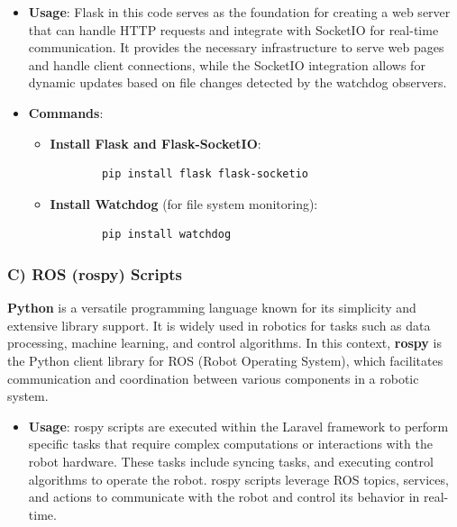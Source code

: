 \begin{itemize}
\item \textbf{Usage}: Flask in this code serves as the foundation for creating a web server that can handle HTTP requests and integrate with SocketIO for real-time communication. It provides the necessary infrastructure to serve web pages and handle client connections, while the SocketIO integration allows for dynamic updates based on file changes detected by the watchdog observers. 


\newpage
\item \textbf{Commands}:
    \begin{itemize}
        \item \textbf{Install Flask and Flask-SocketIO}:
        \begin{verbatim}
        pip install flask flask-socketio
        \end{verbatim}
        \vspace{-2mm}
        \item \textbf{Install Watchdog} (for file system monitoring):
        \begin{verbatim}
        pip install watchdog
        \end{verbatim}
        

    \end{itemize}

\end{itemize}

\vspace{-3mm}

\subsubsection*{C) ROS (rospy) Scripts}

\textbf{Python} is a versatile programming language known for its simplicity and extensive library support. It is widely used in robotics for tasks such as data processing, machine learning, and control algorithms. In this context, \textbf{rospy} is the Python client library for ROS (Robot Operating System), which facilitates communication and coordination between various components in a robotic system.

\begin{itemize}
\item \textbf{Usage}: rospy scripts are executed within the Laravel framework to perform specific tasks that require complex computations or interactions with the robot hardware. These tasks include syncing tasks, and executing control algorithms to operate the robot. rospy scripts leverage ROS topics, services, and actions to communicate with the robot and control its behavior in real-time.
\end{itemize}


